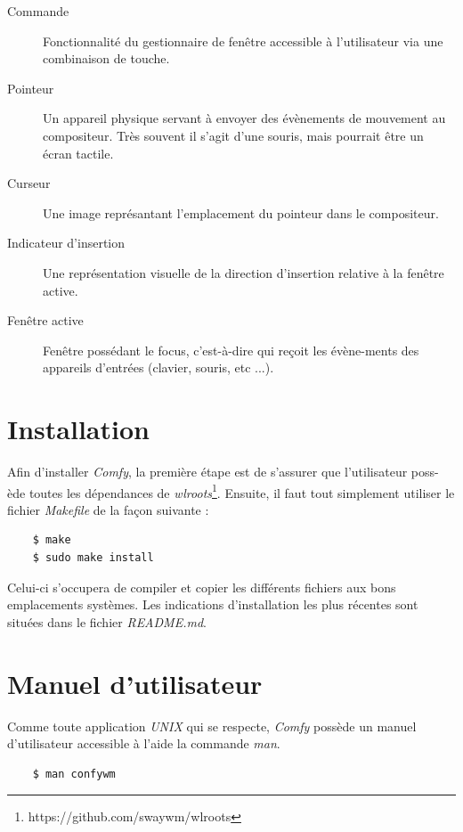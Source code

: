 \documentclass[titlepage]{article}
\begin{document}
\begin{description}
	\item [Commande] Fonctionnalité du gestionnaire de fenêtre accessible à l'utilisateur via une combinaison de touche.
	\item [Pointeur] Un appareil physique servant à envoyer des évènements de mouvement au compositeur. Très souvent il s'agit d'une souris, mais pourrait être un écran tactile.
	\item [Curseur] Une image représantant l'emplacement du pointeur dans le compositeur.
	\item [Indicateur d'insertion] Une représentation visuelle de la direction d'insertion relative à la fenêtre active.
	\item [Fenêtre active] Fenêtre possédant le focus, c'est-à-dire qui reçoit les évène-ments des appareils d'entrées (clavier, souris, etc ...).
\end{description}

\section{Installation}
Afin d'installer \textit{Comfy}, la première étape est de s'assurer que l'utilisateur poss-ède toutes les dépendances de \textit{wlroots}\footnote{https://github.com/swaywm/wlroots}. Ensuite, il faut tout simplement utiliser le fichier \textit{Makefile} de la façon suivante :
\begin{verbatim}
	$ make
	$ sudo make install
\end{verbatim}

\par
Celui-ci s'occupera de compiler et copier les différents fichiers aux bons emplacements systèmes. Les indications d'installation les plus récentes sont situées dans le fichier \textit{README.md}.

\section{Manuel d'utilisateur}
Comme toute application \textit{UNIX} qui se respecte, \textit{Comfy} possède un manuel d'utilisateur accessible à l'aide la commande \textit{man}.

\begin{verbatim}
	$ man confywm
\end{verbatim}
\end{document}
